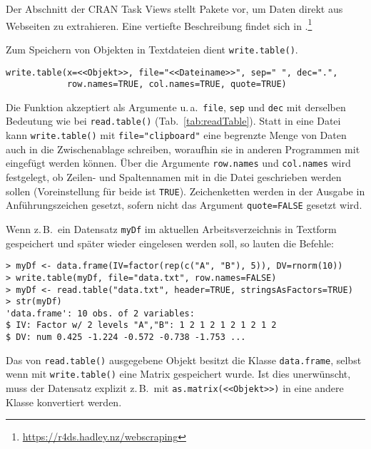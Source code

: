 Der Abschnitt  der CRAN Task Views \cite{CRANtvWebTech} stellt Pakete vor, um Daten direkt aus Webseiten zu extrahieren. Eine vertiefte Beschreibung findet sich in .\footnote{\url{https://r4ds.hadley.nz/webscraping}}

Zum Speichern von Objekten in Textdateien dient \lstinline!write.table()!.
\begin{lstlisting}
write.table(x=<<Objekt>>, file="<<Dateiname>>", sep=" ", dec=".",
            row.names=TRUE, col.names=TRUE, quote=TRUE)
\end{lstlisting}

Die Funktion akzeptiert als Argumente u.\,a.\ \lstinline!file!, \lstinline!sep! und \lstinline!dec! mit derselben Bedeutung wie bei \lstinline!read.table()! (Tab.\ \ref{tab:readTable}). Statt in eine Datei kann \lstinline!write.table()! mit \lstinline!file="clipboard"! eine begrenzte Menge von Daten auch in die Zwischenablage schreiben, woraufhin sie in anderen Programmen mit  eingefügt werden können. Über die Argumente \lstinline!row.names! und \lstinline!col.names! wird festgelegt, ob Zeilen- und Spaltennamen mit in die Datei geschrieben werden sollen (Voreinstellung für beide ist \lstinline!TRUE!). Zeichenketten werden in der Ausgabe in Anführungszeichen gesetzt, sofern nicht das Argument \lstinline!quote=FALSE! gesetzt wird.

Wenn z.\,B.\ ein Datensatz \lstinline!myDf! im aktuellen Arbeitsverzeichnis in Textform gespeichert und später wieder eingelesen werden soll, so lauten die Befehle:
\begin{lstlisting}
> myDf <- data.frame(IV=factor(rep(c("A", "B"), 5)), DV=rnorm(10))
> write.table(myDf, file="data.txt", row.names=FALSE)
> myDf <- read.table("data.txt", header=TRUE, stringsAsFactors=TRUE)
> str(myDf)
'data.frame': 10 obs. of 2 variables:
$ IV: Factor w/ 2 levels "A","B": 1 2 1 2 1 2 1 2 1 2
$ DV: num 0.425 -1.224 -0.572 -0.738 -1.753 ...
\end{lstlisting}

Das von \lstinline!read.table()! ausgegebene Objekt besitzt die Klasse \lstinline!data.frame!, selbst wenn mit \lstinline!write.table()! eine Matrix gespeichert wurde. Ist dies unerwünscht, muss der Datensatz explizit z.\,B.\ mit \lstinline!as.matrix(<<Objekt>>)! in eine andere Klasse konvertiert werden.

